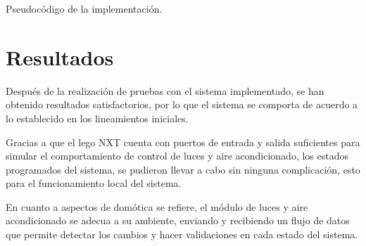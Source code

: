\documentclass[journal]{IEEEtran}
\begin{document}
\begin{algorithm}
\caption{Pseudocódigo de la implementación.}
\begin{algorithmic}[1]
     \EndIf
     \EndIf
     \EndIf
     
     \EndIf
     \EndIf
     \EndIf
     \EndIf
     \EndIf
     
   
     \EndIf
     \EndIf
     \EndIf
       \EndIf

   \EndCase
    
  \EndSwitch
\end{algorithmic}
\label{alg:pseudocodigo}
\end{algorithm}



\section{Resultados} 
\label{sec:resultados}
Después de la realización de pruebas con el sistema implementado, se han obtenido resultados satisfactorios, por lo que el sistema se comporta de acuerdo a lo establecido en los lineamientos iniciales.

Gracias a que el lego NXT cuenta con puertos de entrada y salida suficientes para simular el comportamiento de control de luces y aire acondicionado, los estados programados del sistema, se pudieron llevar a cabo sin ninguna complicación, esto para el funcionamiento local del sistema.

En cuanto a aspectos de domótica se refiere, el módulo de luces y aire acondicionado se adecua a su ambiente, enviando y recibiendo un flujo de datos que permite detectar los cambios y hacer validaciones en cada estado del sistema.
\end{document}
